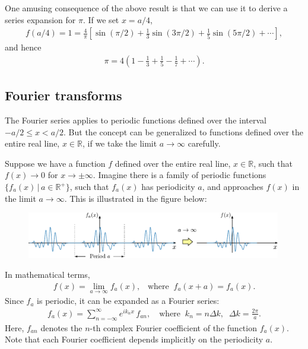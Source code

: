 \documentclass[10pt,a4paper]{article}
\begin{document}
One amusing consequence of the above result is that we can use it to
derive a series expansion for $\pi$.  If we set $x = a/4$,
\begin{align}
  f(a/4) = 1 = \frac{4}{\pi} \left[\sin(\pi/2) + \frac{1}{3}\sin(3\pi/2) + \frac{1}{5}\sin(5\pi/2) + \cdots\right],
\end{align}
and hence
\begin{align}
  \pi = 4 \left(1 - \frac{1}{3} + \frac{1}{5} - \frac{1}{7} + \cdots\right).
\end{align}

\subsection{Fourier transforms}\label{fourier-transforms}

The Fourier series applies to periodic functions defined over the
interval $-a/2 \le x < a/2$.  But the concept can be generalized to
functions defined over the entire real line, $x \in \mathbb{R}$, if we
take the limit $a \rightarrow \infty$ carefully.

Suppose we have a function $f$ defined over the entire real line, $x
\in \mathbb{R}$, such that $f(x) \rightarrow 0$ for $x \rightarrow
\pm\infty$.  Imagine there is a family of periodic functions
$\big\{f_a(x) \,\big|\, a \in\mathbb{R}^+\big\}$, such that $f_a(x)$
has periodicity $a$, and approaches $f(x)$ in the limit $a\rightarrow
\infty$.  This is illustrated in the figure below:

\begin{figure}[ht]
  \includegraphics[width=0.99\textwidth]{periodicity_ft}
\end{figure}

In mathematical terms,
\begin{align}
  f(x) = \lim_{a \rightarrow \infty} f_a(x), \;\;\;\text{where}\;\; f_a(x+a) = f_a(x).
\end{align}
Since $f_a$ is periodic, it can be expanded as a Fourier series:
\begin{align}
  f_a(x) = \sum_{n=-\infty}^\infty e^{i k_n x}\, f_{an}, \quad\mathrm{where}\;\; k_n = n\Delta k, \;\; \Delta k = \frac{2\pi}{a}.
\end{align}
Here, $f_{an}$ denotes the $n$-th complex Fourier coefficient of the
function $f_a(x)$.  Note that each Fourier coefficient depends
implicitly on the periodicity $a$.
\end{document}
